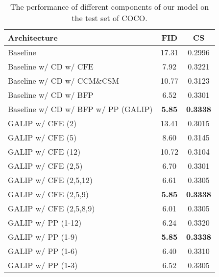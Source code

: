 \documentclass[10pt,twocolumn,letterpaper]{article}
\begin{document}
\begin{table}[t] \small
\centering
\caption{The performance of different components of our model on the test set of COCO.}
\begin{tabular}{l|c|c}\toprule
Architecture                                              &FID              &CS  \\ \midrule
Baseline                                                  & 17.31                       & 0.2996         \\
Baseline w/ CD w/ CFE                                     & 7.92                        & 0.3221          \\
Baseline w/ CD w/ CCM\&CSM                                & 10.77                       & 0.3123           \\
Baseline w/ CD w/ BFP                                     & 6.52                        & 0.3301           \\
Baseline w/ CD w/ BFP w/ PP (GALIP)                       & \textbf{5.85}               & \textbf{0.3338}\\ \bottomrule
GALIP w/ CFE (2)                                   & 13.41                 & 0.3015          \\
GALIP w/ CFE (5)                                  & 8.60                   & 0.3145          \\
GALIP w/ CFE (12)                                 & 10.72                  & 0.3104          \\
GALIP w/ CFE (2,5)                         & 6.70                   & 0.3301          \\
GALIP w/ CFE (2,5,12)               & 6.61                   & 0.3305          \\
GALIP w/ CFE (2,5,9)                & \textbf{5.85}          & \textbf{0.3338}          \\
GALIP w/ CFE (2,5,8,9)       & 6.01                   & 0.3305          \\\bottomrule

GALIP w/ PP (1-12)                          & 6.24                  & 0.3320           \\
GALIP w/ PP (1-9)                           & \textbf{5.85}         & \textbf{0.3338}          \\
GALIP w/ PP (1-6)                           & 6.40                  & 0.3310          \\
GALIP w/ PP (1-3)                           & 6.52                  & 0.3305          \\\bottomrule
\end{tabular}
\label{table3}
\vspace{-0.4cm}
\end{table}
\end{document}
